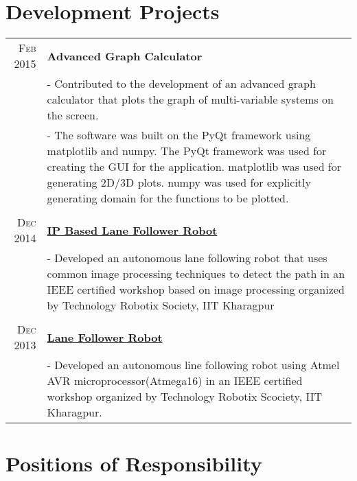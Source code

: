 \documentclass[a4paper,10pt]{article} %
\begin{document}
\section{Development Projects}

\begin{tabular}{r|p{11cm}}

\textsc{Feb 2015} & \textbf{Advanced Graph Calculator} \\
& \footnotesize{- Contributed to the development of an advanced graph calculator that plots the graph of multi-variable systems on the screen.}\\
& \footnotesize{- The software was built on the PyQt framework using matplotlib and numpy. The PyQt framework was used for creating the GUI for the application. matplotlib was used for generating 2D/3D plots. numpy was used for explicitly generating domain for the functions to be plotted.}\\
\multicolumn{2}{c}{} \\

\textsc{Dec 2014} & \textbf{\href{http://www.robotix.in/tutorials/categ/opencv/lane_follow}{IP Based Lane Follower Robot}} \\
& \footnotesize{- Developed an autonomous lane following robot that uses common image processing techniques to detect the path in an IEEE certified workshop based on image processing organized by Technology Robotix Society, IIT Kharagpur}\\
\multicolumn{2}{c}{} \\

\textsc{Dec 2013} & \textbf{\href{http://www.robotix.in/tutorials/categ/auto/lfr}{Lane Follower Robot}} \\
& \footnotesize{- Developed an autonomous line following robot using Atmel AVR microprocessor(Atmega16) in an IEEE certified workshop organized by Technology Robotix Scociety, IIT Kharagpur.}\\
\end{tabular}



\section{Positions of Responsibility}
\end{document}
